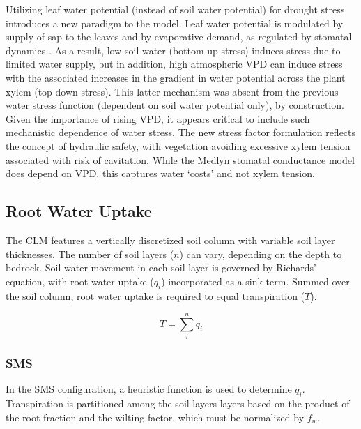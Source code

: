 \documentclass[draft,linenumbers]{agujournal}
\begin{document}
    Utilizing leaf water potential (instead of soil water potential) for drought stress introduces a new paradigm to the model. 
    Leaf water potential is modulated by supply of sap to the leaves and by evaporative demand, as regulated by stomatal dynamics \citep{novick2016a}. 
    As a result, low soil water (bottom-up stress) induces stress due to limited water supply, but in addition, high atmospheric VPD can induce stress with the associated increases in the gradient in water potential across the plant xylem (top-down stress). 
    This latter mechanism was absent from the previous water stress function (dependent on soil water potential only), by construction.
    Given the importance of rising VPD, it appears critical to include such mechanistic dependence of water stress.
    The new stress factor formulation reflects the concept of hydraulic safety, with vegetation avoiding excessive xylem tension associated with risk of cavitation.
    While the Medlyn stomatal conductance model does depend on VPD, this captures water `costs' and not xylem tension.

\subsection{Root Water Uptake}
\label{sect:rwu}
    The CLM features a vertically discretized soil column with variable soil layer thicknesses.
    The number of soil layers ($n$) can vary, depending on the depth to bedrock.
    Soil water movement in each soil layer is governed by Richards' equation, with root water uptake ($q_i$) incorporated as a sink term.
    Summed over the soil column, root water uptake is required to equal transpiration ($T$).

    \begin{linenomath*}
    \begin{equation}
    T = \sum^n_i{q_i}
    \end{equation}
    \end{linenomath*} 

\subsubsection{SMS}
\label{sect:smsrwu}
    
    In the SMS configuration, a heuristic function is used to determine $q_i$.
    Transpiration is partitioned among the soil layers layers based on the product of the root fraction and the wilting factor, which must be normalized by $f_w$. 
    
\end{document}
